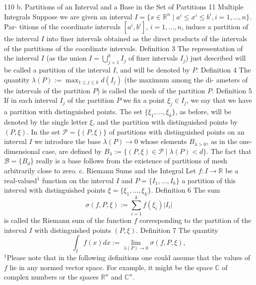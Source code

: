 110
b. Partitions of an Interval and a Base in the Set of Partitions
11 Multiple Integrals
Suppose we are given an interval $I = \{x \in \mathbb{R}^n \mid a^i \le x^i \le b^i, i = 1, \ldots, n\}$. Par-
titions of the coordinate intervals $[a^i, b^i]$, $i = 1,\ldots, n$, induce a partition of the
interval $I$ into finer intervals obtained as the direct products of the intervals of the
partitions of the coordinate intervals.
Definition 3 The representation of the interval $I$ (as the union $I = \bigcup_{j=1}^k I_j$ of finer
intervals $I_j$) just described will be called a partition of the interval $I$, and will be
denoted by $P$.
Definition 4 The quantity $\lambda(P) := \max_{1\le j\le k} d(I_j)$ (the maximum among the di-
ameters of the intervals of the partition $P$) is called the mesh of the partition $P$.
Definition 5 If in each interval $I_j$ of the partition $P$ we fix a point $\xi_j \in I_j$, we say
that we have a partition with distinguished points.
The set $\{\xi_1,\ldots, \xi_k\}$, as before, will be denoted by the single letter $\xi$, and the
partition with distinguished points by $(P, \xi)$.
In the set $\mathcal{P} = \{(P, \xi)\}$ of partitions with distinguished points on an interval $I$ we
introduce the base $\lambda(P) \to 0$ whose elements $B_{\lambda > 0}$, as in the one-dimensional
case, are defined by $B_{\lambda} := \{(P, \xi) \in \mathcal{P} \mid\lambda(P) < d\}$.
The fact that $\mathcal{B} = \{B_d\}$ really is a base follows from the existence of partitions of
mesh arbitrarily close to zero.
c. Riemann Sums and the Integral
Let $f : I \to \mathbb{R}$ be a real-valued$^1$ function on the interval $I$ and $P = \{I_1, \ldots, I_k\}$ a
partition of this interval with distinguished points $\xi = \{\xi_1, \ldots, \xi_k\}$.
Definition 6 The sum
$$
\sigma(f, P, \xi) := \sum_{i=1}^k f(\xi_i)|I_i|
$$
is called the Riemann sum of the function $f$ corresponding to the partition of the
interval $I$ with distinguished points $(P, \xi)$.
Definition 7 The quantity
$$
\int_I f(x)dx := \lim_{\lambda(P)\to 0} \sigma(f, P, \xi),
$$
$^1$Please note that in the following definitions one could assume that the values of $f$ lie in any
normed vector space. For example, it might be the space $\mathbb{C}$ of complex numbers or the spaces $\mathbb{R}^n$
and $\mathbb{C}^n$.